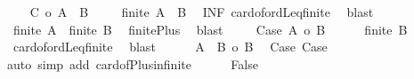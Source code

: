 \begin{isabellebody}
\ \ \isacommand{{\isacharbraceleft}{\kern0pt}}\isamarkupfalse%
\isamarkupfalse%
\ {\isacharasterisk}{\kern0pt}{\isacharcolon}{\kern0pt}\ {\isachardoublequoteopen}{\isacharbar}{\kern0pt}C{\isacharbar}{\kern0pt}\ {\isasymle}o\ {\isacharbar}{\kern0pt}A\ {\isacharless}{\kern0pt}{\isacharplus}{\kern0pt}{\isachargreater}{\kern0pt}\ B{\isacharbar}{\kern0pt}{\isachardoublequoteclose}\isanewline
\ \ \ \isamarkupfalse%
\ {\isachardoublequoteopen}{\isasymnot}finite\ {\isacharparenleft}{\kern0pt}A\ {\isacharless}{\kern0pt}{\isacharplus}{\kern0pt}{\isachargreater}{\kern0pt}\ B{\isacharparenright}{\kern0pt}{\isachardoublequoteclose}\ \isamarkupfalse%
\ INF\ card{\isacharunderscore}{\kern0pt}of{\isacharunderscore}{\kern0pt}ordLeq{\isacharunderscore}{\kern0pt}finite\ \isamarkupfalse%
\ blast\isanewline
\ \ \ \isamarkupfalse%
\ {}{\isacharcolon}{\kern0pt}\ {\isachardoublequoteopen}{\isasymnot}finite\ A\ {\isasymor}\ {\isasymnot}finite\ B{\isachardoublequoteclose}\ \isamarkupfalse%
\ finite{\isacharunderscore}{\kern0pt}Plus\ \isamarkupfalse%
\ blast\isanewline
\ \ \ \isacommand{{\isacharbraceleft}{\kern0pt}}\isamarkupfalse%
\isamarkupfalse%
\ Case{}{}{\isacharcolon}{\kern0pt}\ {\isachardoublequoteopen}{\isacharbar}{\kern0pt}A{\isacharbar}{\kern0pt}\ {\isasymle}o\ {\isacharbar}{\kern0pt}B{\isacharbar}{\kern0pt}{\isachardoublequoteclose}\isanewline
\ \ \ \ \isamarkupfalse%
\ {\isachardoublequoteopen}{\isasymnot}finite\ B{\isachardoublequoteclose}\ \isamarkupfalse%
\ {}\ card{\isacharunderscore}{\kern0pt}of{\isacharunderscore}{\kern0pt}ordLeq{\isacharunderscore}{\kern0pt}finite\ \isamarkupfalse%
\ blast\isanewline
\ \ \ \ \isamarkupfalse%
\ {\isachardoublequoteopen}{\isacharbar}{\kern0pt}A\ {\isacharless}{\kern0pt}{\isacharplus}{\kern0pt}{\isachargreater}{\kern0pt}\ B{\isacharbar}{\kern0pt}\ {\isacharequal}{\kern0pt}o\ {\isacharbar}{\kern0pt}B{\isacharbar}{\kern0pt}{\isachardoublequoteclose}\ \isamarkupfalse%
\ Case{}\ Case{}{}\isanewline
\ \ \ \ \isamarkupfalse%
\ {\isacharparenleft}{\kern0pt}auto\ simp\ add{\isacharcolon}{\kern0pt}\ card{\isacharunderscore}{\kern0pt}of{\isacharunderscore}{\kern0pt}Plus{\isacharunderscore}{\kern0pt}infinite{\isacharparenright}{\kern0pt}\isanewline
\ \ \ \ \isamarkupfalse%
\ False\ \isamarkupfalse%

\end{isabellebody}
